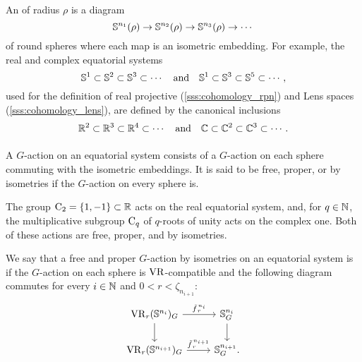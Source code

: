 
\subsubsection{}\label{subsub:VR-compatible-system}

An  of radius \(\rho\) is a diagram
\[
\mathbb{S}^{n_1}(\rho) \to \mathbb{S}^{n_2}(\rho) \to \mathbb{S}^{n_3}(\rho) \to \dotsb
\]
of round spheres where each map is an isometric embedding.
For example, the real and complex equatorial systems
\[
\mathbb{S}^1 \subset \mathbb{S}^2 \subset \mathbb{S}^3 \subset \dotsb
\quad\text{and}\quad
\mathbb{S}^1 \subset \mathbb{S}^3 \subset \mathbb{S}^5 \subset \dotsb,
\]
used for the definition of real projective (\cref{sss:cohomology_rpn}) and Lens spaces (\cref{sss:cohomology_lens}), are defined by the canonical inclusions
\[
\mathbb{R}^2 \subset \mathbb{R}^3 \subset \mathbb{R}^4 \subset \dotsb
\quad\text{and}\quad
\mathbb{C} \subset \mathbb{C}^2 \subset \mathbb{C}^3 \subset \dotsb.
\]

\subsubsection{}\label{ss:system VR compatible}

A \(G\)-action on an equatorial system consists of a \(G\)-action on each sphere commuting with the isometric embeddings.
It is said to be free, proper, or by isometries if the \(G\)-action on every sphere is.

The group \(\mathrm{C}_2 = \{1,-1\} \subset \mathbb{R}\) acts on the real equatorial system, and, for \(q \in \mathbb{N}\), the multiplicative subgroup \(\mathrm{C}_q\) of \(q\)-roots of unity acts on the complex one.
Both of these actions are free, proper, and by isometries.

We say that a free and proper \(G\)-action by isometries on an equatorial system is  if the \(G\)-action on each sphere is \(\mathrm{VR}\)-compatible and the following diagram commutes for every \(i \in \mathbb{N}\) and $0 < r < \zeta_{n_{i+1}}$:
\begin{equation}\label{eq:VR_quotient}
    \begin{tikzcd}
	\VR_r(\bS^{n_i})_G
	\ar[d]
	\ar[r, "\tilde f_{\,r}^{\,n_i}" above]
	&
	\bS^{n_i}_G
	\ar[d]
	\\
	\VR_r(\bS^{n_{i+1}})_G
	\ar[r, "\tilde f_{\,r}^{\,n_{i+1}}" above]
	&
	\bS^{n_{i+1}}_G.
\end{tikzcd}
\end{equation}

